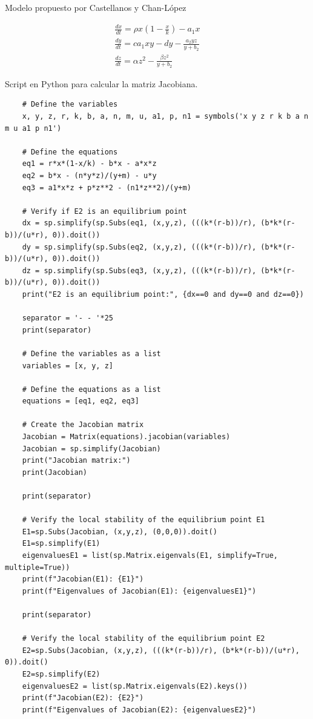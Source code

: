 \documentclass{wscpaperproc}
\theoremstyle{wsc}
\begin{document}
\begin{center}
	Modelo propuesto por Castellanos y Chan-López
\end{center}
\begin{equation} \label{Holling1y2_Castellanos}
	\begin{gathered}
		\frac{d x}{d t}=\rho x\left(1-\frac{x}{k}\right)-a_1 x \\
		\frac{d y}{d t}=c a_1 x y-d y-\frac{a_2 y z}{y+b_2} \\
		\frac{d z}{d t}=\alpha z^2-\frac{\beta z^2}{y+b_2}
	\end{gathered}
\end{equation}

\begin{center}
	Script en Python para calcular la matriz Jacobiana.
\end{center}
\begin{verbatim}
	# Define the variables
	x, y, z, r, k, b, a, n, m, u, a1, p, n1 = symbols('x y z r k b a n m u a1 p n1')
	
	# Define the equations
	eq1 = r*x*(1-x/k) - b*x - a*x*z
	eq2 = b*x - (n*y*z)/(y+m) - u*y
	eq3 = a1*x*z + p*z**2 - (n1*z**2)/(y+m)
	
	# Verify if E2 is an equilibrium point
	dx = sp.simplify(sp.Subs(eq1, (x,y,z), (((k*(r-b))/r), (b*k*(r-b))/(u*r), 0)).doit())
	dy = sp.simplify(sp.Subs(eq2, (x,y,z), (((k*(r-b))/r), (b*k*(r-b))/(u*r), 0)).doit())
	dz = sp.simplify(sp.Subs(eq3, (x,y,z), (((k*(r-b))/r), (b*k*(r-b))/(u*r), 0)).doit())
	print("E2 is an equilibrium point:", {dx==0 and dy==0 and dz==0})
	
	separator = '- - '*25
	print(separator)
	
	# Define the variables as a list
	variables = [x, y, z]
	
	# Define the equations as a list
	equations = [eq1, eq2, eq3]
	
	# Create the Jacobian matrix
	Jacobian = Matrix(equations).jacobian(variables)
	Jacobian = sp.simplify(Jacobian)
	print("Jacobian matrix:")
	print(Jacobian)
	
	print(separator)
	
	# Verify the local stability of the equilibrium point E1
	E1=sp.Subs(Jacobian, (x,y,z), (0,0,0)).doit()
	E1=sp.simplify(E1)
	eigenvaluesE1 = list(sp.Matrix.eigenvals(E1, simplify=True, multiple=True))
	print(f"Jacobian(E1): {E1}")
	print(f"Eigenvalues of Jacobian(E1): {eigenvaluesE1}")
	
	print(separator)
	
	# Verify the local stability of the equilibrium point E2
	E2=sp.Subs(Jacobian, (x,y,z), (((k*(r-b))/r), (b*k*(r-b))/(u*r), 0)).doit()
	E2=sp.simplify(E2)
	eigenvaluesE2 = list(sp.Matrix.eigenvals(E2).keys())
	print(f"Jacobian(E2): {E2}")
	print(f"Eigenvalues of Jacobian(E2): {eigenvaluesE2}")
	

\end{verbatim}
\end{document}
